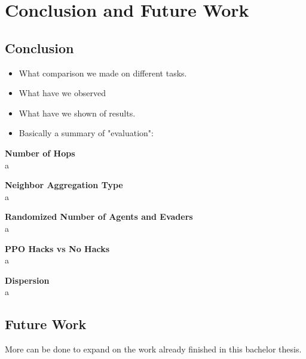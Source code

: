 
\chapter{Conclusion and Future Work}

\section{Conclusion}
\begin{itemize}[noitemsep,nolistsep]
	\item What comparison we made on different tasks.
	\item What have we observed
	\item What have we shown of results.
	\item Basically a summary of "evaluation":
\end{itemize}
\textbf{Number of Hops}\\
a \par

\textbf{Neighbor Aggregation Type}\\
a  \par

\textbf{Randomized Number of Agents and Evaders}\\
a  \par

\textbf{PPO Hacks vs No Hacks}\\
a  \par

\textbf{Dispersion}\\
a  \par


\section{Future Work}
More can be done to expand on the work already finished in this bachelor thesis.\par

